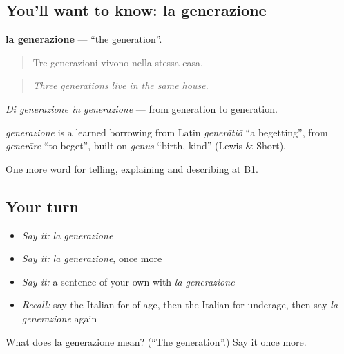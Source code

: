 \subsection*{You'll want to know: la generazione}
\textbf{la generazione} — \textquotedblleft{}the generation\textquotedblright{}.

\begin{quote}
Tre generazioni vivono nella stessa casa.
\end{quote}

\begin{quote}
\emph{Three generations live in the same house.}
\end{quote}

\emph{Di generazione in generazione} — from generation to generation.

\begin{cousinweb}
\emph{generazione} is a learned borrowing from Latin \emph{generātiō} \textquotedblleft{}a begetting\textquotedblright{}, from \emph{generāre} \textquotedblleft{}to beget\textquotedblright{}, built on \emph{genus} \textquotedblleft{}birth, kind\textquotedblright{} (Lewis \& Short).
\end{cousinweb}

\begin{grammarlens}[title={What you've built}]
One more word for telling, explaining and describing at B1.
\end{grammarlens}

\subsection*{Your turn}
\begin{itemize}
\raggedright
  \item \emph{Say it:} \emph{la generazione}
  \item \emph{Say it:} \emph{la generazione}, once more
  \item \emph{Say it:} a sentence of your own with \emph{la generazione}
  \item \emph{Recall:} say the Italian for of age, then the Italian for underage, then say \emph{la generazione} again
\end{itemize}

\begin{tcolorbox}[breakable,colback=teal!4,colframe=teal!35!black,title={Before you move on}]
What does la generazione mean? (\textquotedblleft{}The generation\textquotedblright{}.) Say it once more.
\end{tcolorbox}
